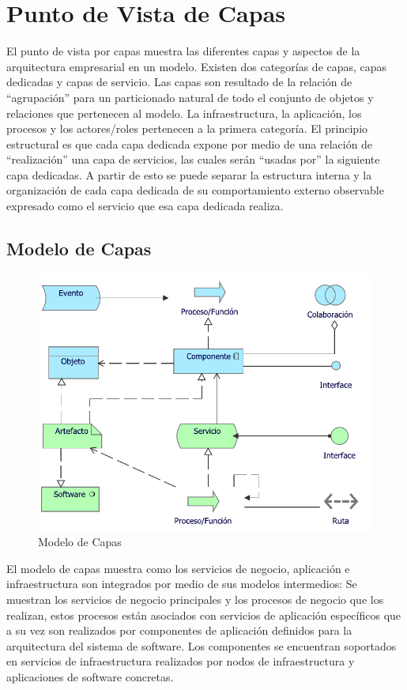 \section{Punto de Vista de Capas}

El punto de vista por capas muestra las diferentes capas y aspectos de la arquitectura empresarial en un modelo. Existen dos categorías de capas, capas dedicadas y capas de servicio. Las capas son resultado de la relación de “agrupación” para un particionado natural de todo el conjunto de objetos y relaciones que pertenecen al modelo. La infraestructura, la aplicación, los procesos y los actores/roles pertenecen a la primera categoría. El principio estructural es que cada capa dedicada expone por medio de una relación de “realización” una capa de servicios, las cuales serán “usadas por” la siguiente capa dedicadas. A partir de esto se puede separar la estructura interna y la organización de cada capa dedicada de su comportamiento externo observable expresado como el servicio que esa capa dedicada realiza. 

\subsection{Modelo de Capas}
\begin{figure}[h!]
	\centering
	\includegraphics[width=.5\linewidth]{imgs/modelo/Implementacion}
	\caption{Modelo de Capas}
\end{figure}

El modelo de capas muestra como los servicios de negocio, aplicación e infraestructura son integrados por medio de sus modelos intermedios: Se muestran los servicios de negocio principales y los procesos de negocio que los realizan, estos procesos están asociados con servicios de aplicación específicos que a su vez son realizados por componentes de aplicación definidos para la arquitectura del sistema de software. Los componentes se encuentran soportados en servicios de infraestructura realizados por nodos de infraestructura y aplicaciones de software concretas.

